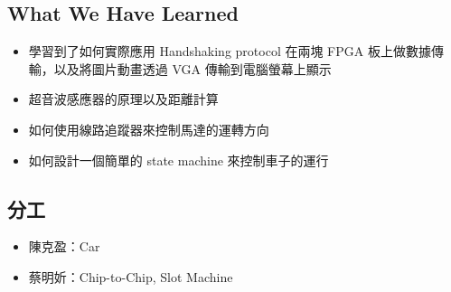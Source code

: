 \documentclass[10.5pt,compsoc,UTF8]{CjC}
\theoremstyle{mystyle}
\begin{document}
\newpage
\newpage

\subsection{What We Have Learned}

\begin{itemize}
  \item 學習到了如何實際應用 Handshaking protocol 在兩塊 FPGA 板上做數據傳輸，以及將圖片動畫透過 VGA 傳輸到電腦螢幕上顯示
  \item 超音波感應器的原理以及距離計算
  \item 如何使用線路追蹤器來控制馬達的運轉方向
  \item 如何設計一個簡單的 state machine 來控制車子的運行
\end{itemize}

\subsection{分工}
\begin{itemize}
  \item 陳克盈：Car
  \item 蔡明妡：Chip-to-Chip, Slot Machine
\end{itemize}
\end{document}
